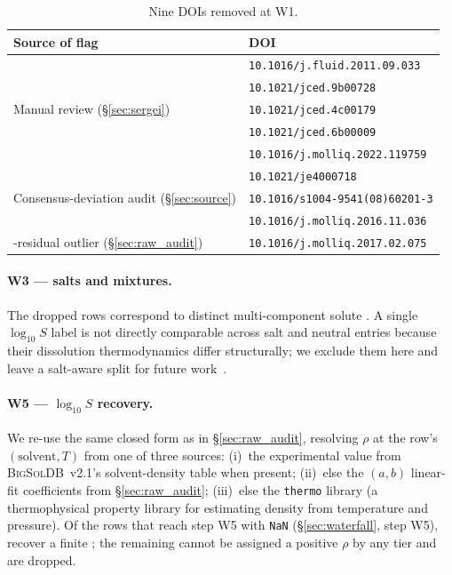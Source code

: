 \begin{table}[h]
\centering\footnotesize
\caption{Nine DOIs removed at W1.}
\label{tab:bad_dois}
\begin{tabular}{@{}l l@{}}
\toprule
Source of flag & DOI \\
\midrule
\multirow{5}{*}{Manual review (§\ref{sec:sergei})}
  & \texttt{10.1016/j.fluid.2011.09.033} \\
  & \texttt{10.1021/jced.9b00728} \\
  & \texttt{10.1021/jced.4c00179} \\
  & \texttt{10.1021/jced.6b00009} \\
  & \texttt{10.1016/j.molliq.2022.119759} \\
\midrule
\multirow{3}{*}{Consensus-deviation audit (§\ref{sec:source})}
  & \texttt{10.1021/je4000718} \\
  & \texttt{10.1016/s1004-9541(08)60201-3} \\
  & \texttt{10.1016/j.molliq.2016.11.036} \\
\midrule
\logS{}-residual outlier (§\ref{sec:raw_audit})
  & \texttt{10.1016/j.molliq.2017.02.075} \\
\bottomrule
\end{tabular}
\end{table}

\paragraph{W3 --- salts and mixtures.}  The  dropped
rows correspond to  distinct multi-component solute
\SMILES{}.  A single $\log_{10} S$ label is not directly comparable
across salt and neutral entries because their dissolution thermodynamics
differ structurally; we exclude them here and leave a salt-aware split
for future work~.

\paragraph{W5 --- $\log_{10} S$ recovery.}  We re-use the same closed
form as in §\ref{sec:raw_audit}, resolving $\rho$ at the row's
$(\text{solvent}, T)$ from one of three sources: (i)~the experimental value from
\textsc{BigSolDB}~v2.1's solvent-density table when present; (ii)~else
the $(a,b)$ linear-fit coefficients from §\ref{sec:raw_audit}; (iii)~else the
\texttt{thermo} library (a thermophysical property library for estimating density from temperature and pressure).  Of the
 rows that reach step W5 with \texttt{NaN} \logS{} (§\ref{sec:waterfall}, step W5),
 recover a finite \logS{}; the remaining  cannot be assigned
a positive $\rho$ by any tier and are dropped.


